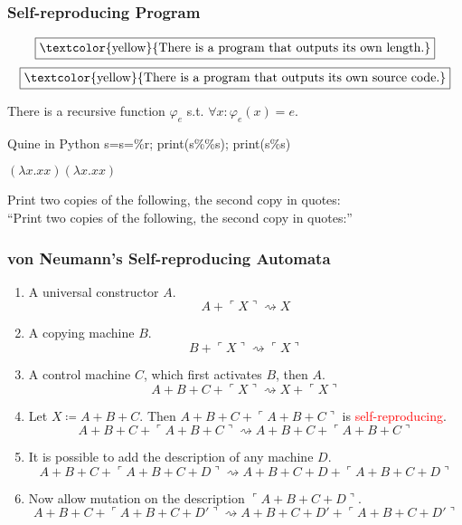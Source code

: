 \documentclass[UTF8,11pt,colorlinks,compress,openany]{beamer}%
\begin{document}
\begin{frame}\frametitle{Self-reproducing Program}
	\[\fbox{\textcolor{yellow}{There is a program that outputs its own length.}}\]
	\[\fbox{\textcolor{yellow}{There is a program that outputs its own source code.}}\]
	\begin{corollary}
		There is a recursive function $\varphi_e$ s.t. $\forall x: \varphi_e(x)=e$.
	\end{corollary}
\begin{block}{Quine in Python}
s=\textquotesingle s=\%r; print(s\%\%s)\textquotesingle; print(s\%s)
\end{block}
\centerline{$(\lambda x.xx)(\lambda x.xx)$}
\begin{block}{}
	Print two copies of the following, the second copy in quotes:\\
	``Print two copies of the following, the second copy in quotes:''
\end{block}
	\centerline{\fbox{\textcolor{green}{DNA / mutation / evolution}}}
\end{frame}

\begin{frame}\frametitle{von Neumann's Self-reproducing Automata}
	\begin{enumerate}
		\item A universal constructor $A$.
		\[A+\ulcorner X\urcorner\rightsquigarrow X\]
		\item A copying machine $B$.
		\[B+\ulcorner X\urcorner\rightsquigarrow\ulcorner X\urcorner\]
		\item A control machine $C$, which first activates $B$, then $A$.
		\[A+B+C+\ulcorner X\urcorner\rightsquigarrow X+\ulcorner X\urcorner\]
		\item Let $X\coloneqq A+B+C$. {Then} $A+B+C+\ulcorner A+B+C\urcorner$ is \textcolor{red}{self-reproducing}.
		\[A+B+C+\ulcorner A+B+C\urcorner\rightsquigarrow A+B+C+\ulcorner A+B+C\urcorner\]
		\item It is possible to add the description of any machine $D$.
		\[A+B+C+\ulcorner A+B+C+D\urcorner\rightsquigarrow A+B+C+D+\ulcorner A+B+C+D\urcorner\]
		\item Now allow mutation on the description $\ulcorner A+B+C+D\urcorner$.
		\[A+B+C+\ulcorner A+B+C+D'\urcorner\rightsquigarrow A+B+C+D'+\ulcorner A+B+C+D'\urcorner\]
	\end{enumerate}
\end{frame}
\end{document}

